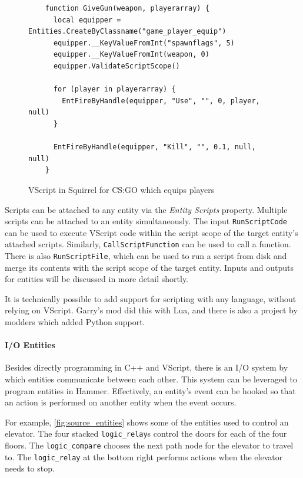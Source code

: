 \documentclass[a4paper, 12pt]{scrartcl}
\begin{document}
\begin{figure}[!ht]
  \begin{verbatim}
    function GiveGun(weapon, playerarray) {
      local equipper = Entities.CreateByClassname("game_player_equip")
      equipper.__KeyValueFromInt("spawnflags", 5)
      equipper.__KeyValueFromInt(weapon, 0)
      equipper.ValidateScriptScope()

      for (player in playerarray) {
        EntFireByHandle(equipper, "Use", "", 0, player, null)
      }

      EntFireByHandle(equipper, "Kill", "", 0.1, null, null)
    }
  \end{verbatim}
  \caption{VScript in Squirrel for CS:GO which equips players}
  \label{fig:source_vscript}
\end{figure}

Scripts can be attached to any entity via the \textit{Entity Scripts} property. Multiple scripts can be attached to an entity simultaneously. The input \texttt{RunScriptCode} can be used to execute VScript code within the script scope of the target entity's attached scripts. Similarly, \texttt{CallScriptFunction} can be used to call a function. There is also \texttt{RunScriptFile}, which can be used to run a script from disk and merge its contents with the script scope of the target entity. Inputs and outputs for entities will be discussed in more detail shortly.

It is technically possible to add support for scripting with any language, without relying on VScript. Garry's mod did this with Lua, and there is also a project by modders which added Python support.

\paragraph{I/O Entities}
Besides directly programming in C++ and VScript, there is an I/O system by which entities communicate between each other. This system can be leveraged to program entities in Hammer. Effectively, an entity's event can be hooked so that an action is performed on another entity when the event occurs.

For example, \cref{fig:source_entities} shows some of the entities used to control an elevator. The four stacked \texttt{logic\_relay}s control the doors for each of the four floors. The \texttt{logic\_compare} chooses the next path node for the elevator to travel to. The \texttt{logic\_relay} at the bottom right performs actions when the elevator needs to stop.
\end{document}
